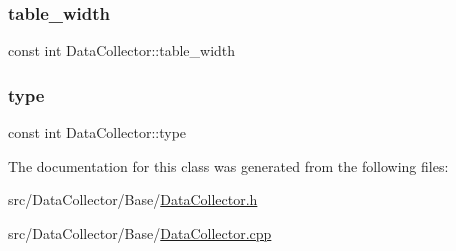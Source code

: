 \mbox{\label{classDataCollector_af46c27a47de92d92dcdae6b26a905a44}} 
\subsubsection{\texorpdfstring{table\+\_\+width}{table\_width}}
{\footnotesize\ttfamily const int Data\+Collector\+::table\+\_\+width}

\mbox{\label{classDataCollector_acad1c22d67a8eb3db056ba776a131900}} 
\subsubsection{\texorpdfstring{type}{type}}
{\footnotesize\ttfamily const int Data\+Collector\+::type}



The documentation for this class was generated from the following files\+:\begin{DoxyCompactItemize}
\item 
src/\+Data\+Collector/\+Base/\mbox{\hyperlink{DataCollector_8h}{Data\+Collector.\+h}}\item 
src/\+Data\+Collector/\+Base/\mbox{\hyperlink{DataCollector_8cpp}{Data\+Collector.\+cpp}}\end{DoxyCompactItemize}
